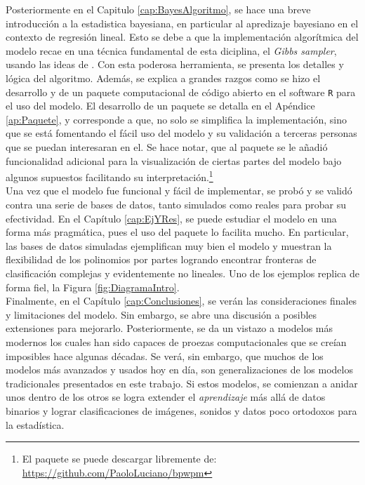 \documentclass[../Main/Main.tex]{subfiles}
\begin{document}
Posteriormente en el Capitulo \ref{cap:BayesAlgoritmo}, se hace una breve introducción a la estadistica bayesiana, en particular al apredizaje bayesiano en el contexto de regresión lineal. Esto se debe a que la implementación algorítmica del modelo recae en una técnica fundamental de esta diciplina, el \textit{Gibbs sampler}, usando las ideas de \autocite{albert1993bayesian}. Con esta poderosa herramienta, se presenta los detalles y lógica del algoritmo. Además, se explica a grandes razgos como se hizo el desarrollo y de un paquete computacional de código abierto en el software \verb|R| para el uso del modelo. El desarrollo de un paquete se detalla en el Apéndice \ref{ap:Paquete}, y corresponde a que, no solo se simplifica la implementación, sino que se está fomentando el fácil uso del modelo y su validación a terceras personas que se puedan interesaran en el. Se hace notar, que al paquete se le añadió funcionalidad adicional para la visualización de ciertas partes del modelo bajo algunos supuestos facilitando su interpretación.\footnote{El paquete se puede descargar libremente de: \url{https://github.com/PaoloLuciano/bpwpm}}\\

Una vez que el modelo fue funcional y fácil de implementar, se probó y se validó contra una serie de bases de datos, tanto simulados como reales para probar su efectividad. En el Capítulo \ref{cap:EjYRes}, se puede estudiar el modelo en una forma más pragmática, pues el uso del paquete lo facilita mucho. En particular, las bases de datos simuladas ejemplifican muy bien el modelo y muestran la flexibilidad de los polinomios por partes logrando encontrar fronteras de clasificación complejas y evidentemente no lineales. Uno de los ejemplos replica de forma fiel, la Figura \ref{fig:DiagramaIntro}.\\ 

Finalmente, en el Capítulo \ref{cap:Conclusiones}, se verán las consideraciones finales y limitaciones del modelo. Sin embargo, se abre una discusión a posibles extensiones para mejorarlo. Posteriormente, se da un vistazo a modelos más modernos los cuales han sido capaces de proezas computacionales que se creían imposibles hace algunas décadas. Se verá, sin embargo, que muchos de los modelos más avanzados y usados hoy en día, son generalizaciones de los modelos tradicionales presentados en este trabajo. Si estos modelos, se comienzan a anidar unos dentro de los otros se logra extender el \textit{aprendizaje} más allá de datos binarios y lograr clasificaciones de imágenes, sonidos y datos poco ortodoxos para la estadística. 
\end{document}
